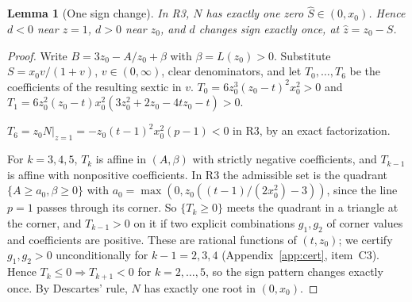 \documentclass[11pt]{amsart}
\newtheorem{lemma}[theorem]{Lemma}
\theoremstyle{definition}
\theoremstyle{remark}
\numberwithin{equation}{section}
\begin{document}
\begin{lemma}[One sign change]\label{lem:P1}
In R3, $N$ has exactly one zero $\hat S\in(0,x_0)$. Hence $d<0$ near $z=1$, $d>0$ near $z_0$, and $d$ changes sign
exactly once, at $\hat z=z_0-\hat S$.
\end{lemma}

\begin{proof}
Write $B=3z_0-A/z_0+\beta$ with $\beta=L(z_0)>0$. Substitute $S=x_0v/(1+v)$, $v\in(0,\infty)$, clear denominators, and
let $T_0,\dots,T_6$ be the coefficients of the resulting sextic in $v$.
$T_0=6z_0^3(z_0-t)^2x_0^2>0$ and $T_1=6z_0^2(z_0-t)x_0^2(3z_0^2+2z_0-4tz_0-t)>0$.

$T_6=z_0N|_{z=1}=-z_0(t-1)^2x_0^2(p-1)<0$ in R3, by an exact factorization.

For $k=3,4,5$, $T_k$ is affine in $(A,\beta)$ with strictly negative coefficients, and $T_{k-1}$ is affine with
nonpositive coefficients. In R3 the admissible set is the quadrant $\{A\ge a_0,\beta\ge0\}$ with
$a_0=\max(0,z_0((t-1)/(2x_0^2)-3))$, since the line $p=1$ passes through its corner. So $\{T_k\ge0\}$ meets the quadrant in
a triangle at the corner, and $T_{k-1}>0$ on it if two explicit combinations $g_1,g_2$ of corner values and
coefficients are positive. These are rational functions of $(t,z_0)$; we certify $g_1,g_2>0$ unconditionally for
$k-1=2,3,4$ (Appendix~\ref{app:cert}, item~C3).
Hence $T_k\le0\Rightarrow T_{k+1}<0$ for $k=2,\dots,5$, so the sign pattern changes exactly once. By Descartes' rule,
$N$ has exactly one root in $(0,x_0)$.
\end{proof}
\end{document}
